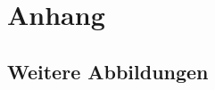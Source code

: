 \documentclass[12pt,			%
a4paper,						%
twoside, 						%
listof=totoc, 					%
bibliography=totoc,				%
titlepage, 						%
headsepline, 					%
DIV18,							%
BCOR6mm,						%
cleardoublepage=empty,			%
parskip,						%
ngerman							%
]{scrbook}
\begin{document}
\appendix
\chapter{Anhang}

\section{Weitere Abbildungen}
\clearpage
{}					%


\end{document}
